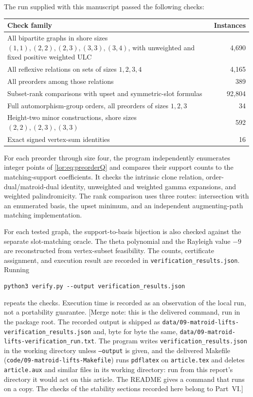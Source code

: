 \documentclass[11pt]{article}
\numberwithin{equation}{section}
\theoremstyle{definition}
\begin{document}
The run supplied with this manuscript passed the following checks:
\begin{center}
\begin{tabular}{p{}r}
\toprule
Check family & Instances\\
\midrule
All bipartite graphs in shore sizes $(1,1),(2,2),(2,3),(3,3),(3,4)$,
with unweighted and fixed positive weighted ULC & 4,690\\
All reflexive relations on sets of sizes $1,2,3,4$ & 4,165\\
All preorders among those relations & 389\\
Subset-rank comparisons with upset and symmetric-slot formulas & 92,804\\
Full automorphism-group orders, all preorders of sizes $1,2,3$ & 34\\
Height-two minor constructions, shore sizes $(2,2),(2,3),(3,3)$ & 592\\
Exact signed vertex-sum identities & 16\\
\bottomrule
\end{tabular}
\end{center}

For each preorder through size four, the program independently enumerates
integer points of \eqref{lor:eq:preorderQ} and compares their support counts to the
matching-support coefficients. It checks the intrinsic clone relation,
order-dual/matroid-dual identity, unweighted and weighted gamma expansions,
and weighted palindromicity. The rank comparison uses three routes:
intersection with an enumerated basis, the upset minimum, and an
independent augmenting-path matching implementation.

For each tested graph, the support-to-basis bijection is also checked
against the separate slot-matching oracle. The theta polynomial and the
Rayleigh value $-9$ are reconstructed from vertex-subset feasibility.
The counts, certificate assignment, and execution result are recorded in
\texttt{verification\_results.json}. Running
\begin{verbatim}
python3 verify.py --output verification_results.json
\end{verbatim}
repeats the checks. Execution time is recorded as an observation of the
local run, not a portability guarantee.
[Merge note: this is the delivered command, run in the package root. The
recorded output is shipped as
\nolinkurl{data/09-matroid-lifts-verification_results.json} and, byte for byte
the same, \nolinkurl{data/09-matroid-lifts-verification_run.txt}. The
program writes \nolinkurl{verification_results.json} in the working
directory unless \texttt{--output} is given, and the delivered Makefile
(\nolinkurl{code/09-matroid-lifts-Makefile}) runs \texttt{pdflatex} on
\texttt{article.tex} and deletes \texttt{article.aux} and similar files in
its working directory: run from this report's directory it would act on
this article. The README gives a command that runs on a copy. The checks of
the stability sections recorded here belong to Part~VI.]
\end{document}
